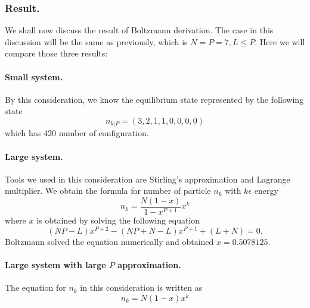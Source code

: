 \documentclass[../../../Main.tex]{subfiles}
\begin{document}
\subsubsection{Result.} We shall now discuss the result of Boltzmann derivation. The case in this discussion will be the same as previously, which is $N = P = 7 , L \leq P$. Here we will compare those three results: 

\paragraph{Small system.} By this consideration, we know the equilibrium state represented by the following state \begin{equation*}
    n_{k|P}=(3, 2, 1, 1, 0, 0, 0, 0)
\end{equation*} which has 420 number of configuration.

\paragraph{Large system.} Tools we used in this consideration are Stirling's approximation and Lagrange multiplier. We obtain the formula for number of particle $n_k$ with $k\epsilon$ energy \begin{equation*}
    n_k=\frac{N(1-x)}{1-x^{P+1}}x^k
\end{equation*}
where $x$ is obtained by solving the following equation
\begin{equation*}
    (N P - L)x^{P+2} - (NP + N - L)x^{P+1} + (L + N ) = 0.
\end{equation*}
Boltzmann solved the equation numerically and obtained $x=0.5078125$.

\paragraph{Large system with large $P$ approximation.} The equation for $n_k$ in this consideration is written as \begin{equation*}
    n_k= N (1 - x)x^k 
\end{equation*}
\end{document}

